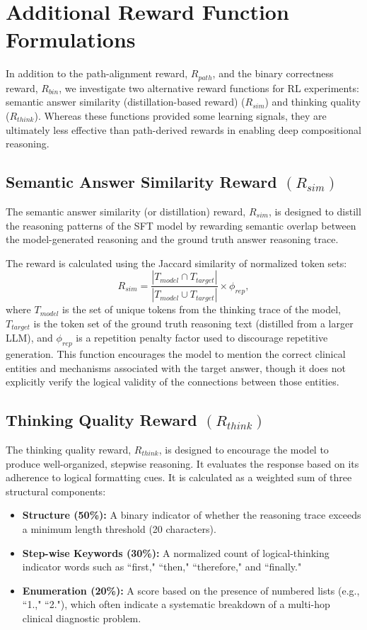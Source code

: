 \documentclass{article}
\theoremstyle{plain}
\theoremstyle{definition}
\theoremstyle{remark}
\begin{document}
\newpage
\section{Additional Reward Function Formulations}
\label{Appendix C}
In addition to the path-alignment reward, $R_{path}$, and the binary correctness reward, $R_{bin}$, we investigate two alternative reward functions for RL experiments: semantic answer similarity (distillation-based reward) ($R_{sim}$) and thinking quality ($R_{think}$). Whereas these functions provided some learning signals, they are ultimately less effective than path-derived rewards in enabling deep compositional reasoning.

\subsection{Semantic Answer Similarity Reward $(R_{sim})$}
The semantic answer similarity (or distillation) reward, $R_{sim}$, is designed to distill the reasoning patterns of the SFT model by rewarding semantic overlap between the model-generated reasoning and the ground truth answer reasoning trace.

The reward is calculated using the Jaccard similarity of normalized token sets:
\[
R_{sim} = \frac{|T_{model} \cap T_{target}|}{|T_{model} \cup T_{target}|} \times \phi_{rep},
\]
where $T_{model}$ is the set of unique tokens from the thinking trace of the model, $T_{target}$ is the token set of the ground truth reasoning text (distilled from a larger LLM), and $\phi_{rep}$ is a repetition penalty factor used to discourage repetitive generation. This function encourages the model to mention the correct clinical entities and mechanisms associated with the target answer, though it does not explicitly verify the logical validity of the connections between those entities.

\subsection{Thinking Quality Reward $(R_{think})$}
The thinking quality reward, $R_{think}$, is designed to encourage the model to produce well-organized, stepwise reasoning. It evaluates the response based on its adherence to logical formatting cues. It is calculated as a weighted sum of three structural components:
\begin{itemize}
    \item \textbf{Structure (50\%):} A binary indicator of whether the reasoning trace exceeds a minimum length threshold (20 characters).
    \item \textbf{Step-wise Keywords (30\%):} A normalized count of logical-thinking indicator words such as ``first," ``then," ``therefore," and ``finally."
    \item \textbf{Enumeration (20\%):} A score based on the presence of numbered lists (e.g., ``1.," ``2."), which often indicate a systematic breakdown of a multi-hop clinical diagnostic problem.
\end{itemize}
\end{document}
